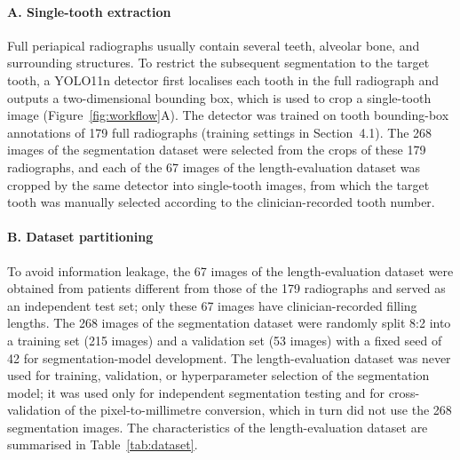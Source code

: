 \paragraph{A. Single-tooth extraction}
Full periapical radiographs usually contain several teeth, alveolar bone, and
surrounding structures. To restrict the subsequent segmentation to the target
tooth, a YOLO11n detector first localises each tooth in the full radiograph and
outputs a two-dimensional bounding box, which is used to crop a single-tooth
image (Figure~\ref{fig:workflow}A). The detector was trained on tooth bounding-box
annotations of 179 full radiographs (training settings in Section~4.1). The 268 images of the segmentation dataset were selected
from the crops of these 179 radiographs, and each of the 67 images of the
length-evaluation dataset was cropped by the same detector into single-tooth
images, from which the target tooth was manually selected according to the
clinician-recorded tooth number.

\paragraph{B. Dataset partitioning}
To avoid information leakage, the 67 images of the length-evaluation dataset were
obtained from patients different from those of the 179 radiographs and served as
an independent test set; only these 67 images have clinician-recorded filling
lengths. The 268 images of the segmentation dataset were randomly split 8:2 into
a training set (215 images) and a validation set (53 images) with a fixed seed of
42 for segmentation-model development. The length-evaluation dataset was never
used for training, validation, or hyperparameter selection of the segmentation
model; it was used only for independent segmentation testing and for
cross-validation of the pixel-to-millimetre conversion, which in turn did not use
the 268 segmentation images. The characteristics of the length-evaluation dataset are summarised in Table~\ref{tab:dataset}.

